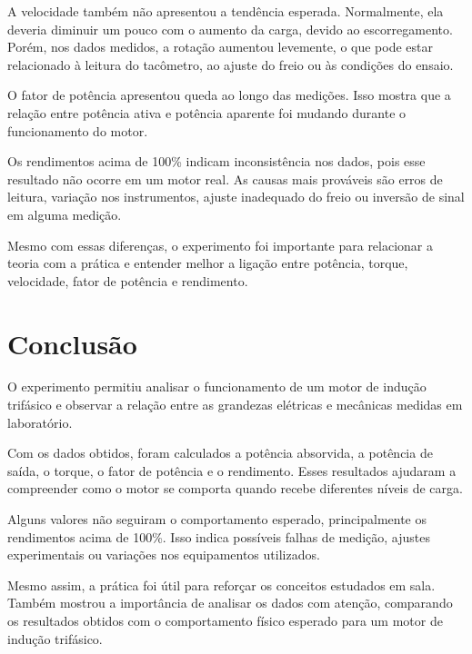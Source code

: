 \documentclass[12pt,a4paper]{article}
\begin{document}
A velocidade também não apresentou a tendência esperada. Normalmente, ela deveria diminuir um pouco com o aumento da carga, devido ao escorregamento. Porém, nos dados medidos, a rotação aumentou levemente, o que pode estar relacionado à leitura do tacômetro, ao ajuste do freio ou às condições do ensaio.

O fator de potência apresentou queda ao longo das medições. Isso mostra que a relação entre potência ativa e potência aparente foi mudando durante o funcionamento do motor.

Os rendimentos acima de 100\% indicam inconsistência nos dados, pois esse resultado não ocorre em um motor real. As causas mais prováveis são erros de leitura, variação nos instrumentos, ajuste inadequado do freio ou inversão de sinal em alguma medição.

Mesmo com essas diferenças, o experimento foi importante para relacionar a teoria com a prática e entender melhor a ligação entre potência, torque, velocidade, fator de potência e rendimento.

\newpage

\section{Conclusão}

O experimento permitiu analisar o funcionamento de um motor de indução trifásico e observar a relação entre as grandezas elétricas e mecânicas medidas em laboratório.

Com os dados obtidos, foram calculados a potência absorvida, a potência de saída, o torque, o fator de potência e o rendimento. Esses resultados ajudaram a compreender como o motor se comporta quando recebe diferentes níveis de carga.

Alguns valores não seguiram o comportamento esperado, principalmente os rendimentos acima de 100\%. Isso indica possíveis falhas de medição, ajustes experimentais ou variações nos equipamentos utilizados.

Mesmo assim, a prática foi útil para reforçar os conceitos estudados em sala. Também mostrou a importância de analisar os dados com atenção, comparando os resultados obtidos com o comportamento físico esperado para um motor de indução trifásico.
\end{document}

